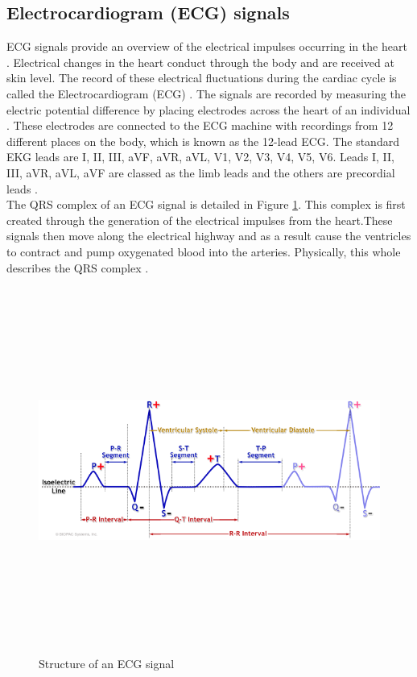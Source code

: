 \documentclass[11pt, a4paper]{article}
\begin{document}
\subsection{Electrocardiogram (ECG) signals} ECG signals provide an overview of the electrical impulses occurring in the heart \cite{Simjanoska20181}. Electrical changes in the heart conduct through the body and are received at skin level. The record of these electrical fluctuations during the cardiac cycle is called the Electrocardiogram (ECG) \cite{Kumar2015}. The signals are recorded by measuring the electric potential difference by placing electrodes across the heart of an individual \cite{Tanveer2018} \cite{Simjanoska20181}. These electrodes are connected to the ECG machine with recordings from 12 different places on the body, which is known as the 12-lead ECG. The standard EKG leads are I, II, III, aVF, aVR, aVL, V1, V2, V3, V4, V5, V6. Leads I, II, III, aVR, aVL, aVF are classed as the limb leads and the others are precordial leads \cite{Tanveer2018}. \\ \newline \noindent The QRS complex of an ECG signal is detailed in Figure \ref{qrs}. This complex is first created through the generation of the electrical impulses from the heart.These signals then move along the electrical highway and as a result cause the ventricles to contract and pump oxygenated blood into the arteries. Physically, this whole describes the QRS complex \cite{Kumar2015}. \begin{figure}[H]
    \centering
    \includegraphics[width=12cm,height=12cm,keepaspectratio]{Figures/qrs.png}
    \caption{Structure of an ECG signal}
    \label{qrs}
\end{figure}
\end{document}
